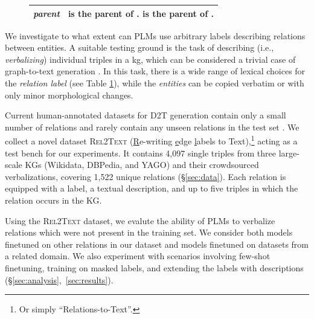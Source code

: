 \begin{figure}[t]
\begin{minipage}{0.4\textwidth}
\begin{tabular}{lp{3.3cm}}
            \textit{parent}     & \eh{} is the parent of \et{}. \newline \et{} is the parent of \eh{}. \\\bottomrule
        \end{tabular}
        \label{tab:example}
    \end{minipage}
\end{figure}

We investigate to what extent can PLMs use arbitrary labels describing relations between entities. A suitable testing ground is the task of describing (i.e., \textit{verbalizing}) individual triples in a \ac{kg}, which can be considered a trivial case of graph-to-text generation \cite{ribeiroInvestigatingPretrainedLanguage2020,koncel-kedziorskiTextGenerationKnowledge2019}. In this task, there is a wide range of lexical choices for the \textit{relation label} (see Table \ref{tab:example}), while the \textit{entities} can be copied verbatim or with only minor morphological changes.

Current human-annotated datasets for D2T generation contain only a small number of relations
and rarely contain any unseen relations in the test set \cite{mille2021automatic}.
We collect a novel dataset \textsc{Rel2Text} (\underline{R}e-writing \underline{e}dge \underline{l}abels to Text),\footnote{Or simply ``Relations-to-Text''.} acting as a test bench for our experiments. It contains 4,097 single triples from three large-scale KGs (Wikidata, \mbox{DBPedia}, and YAGO) and their crowdsourced verbalizations, covering 1,522 unique relations (§\ref{sec:data}). Each relation is equipped with a label, a textual description, and up to five triples in which the relation occurs in the KG.

Using the \textsc{Rel2Text} dataset, we evalute the ability of PLMs to verbalize relations which were not present in the training set. We consider both models finetuned on other relations in our dataset and models finetuned on datasets from a related domain. We also experiment with scenarios involving few-shot finetuning, training on masked labels, and extending the labels with descriptions (§\ref{sec:analysis},~\ref{sec:results}).

